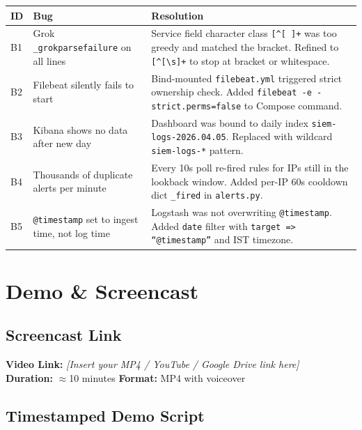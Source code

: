 \documentclass[12pt,a4paper]{article}
\newcommand{\file}[1]{\texttt{\color{accent}#1}}
\newcommand{\field}[1]{\texttt{#1}}
\begin{document}
\begin{center}
\begin{tabular}{p{0.7cm}p{5cm}p{7.5cm}}
  \toprule
  \textbf{ID} & \textbf{Bug} & \textbf{Resolution} \\
  \midrule
  B1 & Grok \texttt{\_grokparsefailure} on all lines &
    Service field character class \texttt{[\^{}[ ]+} was too greedy and matched
    the bracket. Refined to \texttt{[\^{}[\textbackslash{}s]+} to stop at bracket or whitespace. \\
  B2 & Filebeat silently fails to start &
    Bind-mounted \file{filebeat.yml} triggered strict ownership check.
    Added \texttt{filebeat -e -strict.perms=false} to Compose command. \\
  B3 & Kibana shows no data after new day &
    Dashboard was bound to daily index \texttt{siem-logs-2026.04.05}.
    Replaced with wildcard \texttt{siem-logs-*} pattern. \\
  B4 & Thousands of duplicate alerts per minute &
    Every 10s poll re-fired rules for IPs still in the lookback window.
    Added per-IP 60s cooldown dict \texttt{\_fired} in \file{alerts.py}. \\
  B5 & \field{@timestamp} set to ingest time, not log time &
    Logstash was not overwriting \field{@timestamp}. Added \texttt{date} filter
    with \texttt{target => ``@timestamp''} and IST timezone. \\
  \bottomrule
\end{tabular}
\end{center}

\newpage

\section{Demo \& Screencast}

\subsection{Screencast Link}

\begin{infobox}[Screencast]
\textbf{Video Link:} \textit{[Insert your MP4 / YouTube / Google Drive link here]}\\
\textbf{Duration:} $\approx$10 minutes \quad \textbf{Format:} MP4 with voiceover
\end{infobox}

\subsection{Timestamped Demo Script}
\end{document}
